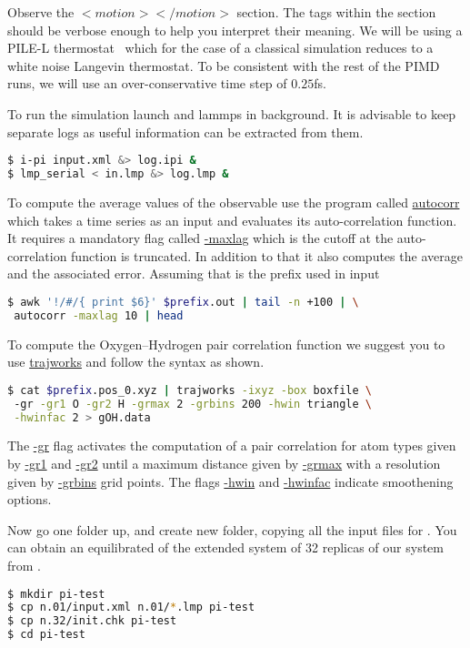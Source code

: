 \documentclass{article}
\begin{document}
\begin{Exercise}[label={water},title={Benchmark of quantum effects in a water molecule}]
\Question
Observe the \lstinxml$<motion></motion>$ section. The tags within the section should be 
verbose enough to help you interpret their meaning. We will be using a PILE-L thermostat~\cite{ceri+10jcp}
 which for the case of a classical simulation reduces to a white noise Langevin thermostat. 
To be consistent with the rest of the PIMD runs, we will use an over-conservative time step of $0.25$fs. 

\Question
To run the simulation launch \ipi{} and lammps in background. It is advisable to keep separate 
logs as useful information can be extracted from them.
\begin{lstlisting}[language=bash]
$ i-pi input.xml &> log.ipi &
$ lmp_serial < in.lmp &> log.lmp &
\end{lstlisting}
To compute the average values of the observable use the program called \url{autocorr} which takes a time series as an input and evaluates its auto-correlation function. It requires a mandatory flag called \url{-maxlag} which is the cutoff at the auto-correlation function is truncated. In addition to that it also computes the average and the associated error. Assuming that  is the prefix used in \ipi{} input \begin{lstlisting}[language=bash]
$ awk '!/#/{ print $6}' $prefix.out | tail -n +100 | \
 autocorr -maxlag 10 | head
\end{lstlisting}

\Question
To compute the Oxygen--Hydrogen pair correlation function we suggest you to use \url{trajworks} and follow the syntax as shown.
\begin{lstlisting}[language=bash]
$ cat $prefix.pos_0.xyz | trajworks -ixyz -box boxfile \ 
 -gr -gr1 O -gr2 H -grmax 2 -grbins 200 -hwin triangle \
 -hwinfac 2 > gOH.data 
\end{lstlisting}
The \url{-gr} flag activates the computation of a pair correlation for atom types given by \url{-gr1} and \url{-gr2} until a maximum distance given by \url{-grmax} with a resolution given by \url{-grbins} grid points. The flags \url{-hwin} and \url{-hwinfac} indicate smoothening options.

\Question
Now go one folder up, and create new folder, copying all the input files 
for . You can obtain an equilibrated 
of the extended system of 32 replicas of our system from 
\lstinbash{n.32/init.chk}.

\begin{lstlisting}[language=bash]
$ mkdir pi-test
$ cp n.01/input.xml n.01/*.lmp pi-test
$ cp n.32/init.chk pi-test
$ cd pi-test
\end{lstlisting}


\end{Exercise}
\end{document}
